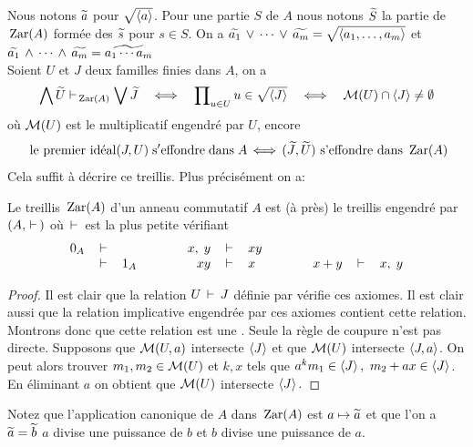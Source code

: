 Nous notons $\wi{a}$ pour $\sqrt{\gen{a}}$. Pour une partie $S$ de $A$
nous notons  $\wi{S}$ la partie de $\Zar(A)$ formée des  $\wi{s}$ pour
$s\in S$. On a $\wi{a_1}\vu\cdots\vu\wi{a_m}=\sqrt{\gen{a_1,\ldots,a_m}}$ 
et
$\wi{a_1}\vi\cdots\vi\wi{a_m}=\wi{a_1\cdots a_m}$ \\
Soient $U$ et  $J$  deux familles finies dans $A$, on a
$$\Vi\wi{U}\vdash_{\Zar(A)} \Vu\wi{J}
\quad\Longleftrightarrow \quad
\prod\nolimits_{u\in U} u  \in \sqrt{\gen{J}}
\quad\Longleftrightarrow \quad
\cM(U)\cap \gen{J}\neq \emptyset
$$
où $\cM(U)$ est le \mo multiplicatif engendré par $U$, \cad encore
$$ \hbox{ le \proi}(J,U){\rm \;s'effondre \;dans  \;  } A
\,\Longleftrightarrow \,
(\wi{J},\wi{U})\hbox{ s'effondre dans } \Zar(A)
$$
Cela suffit à décrire ce treillis. Plus précisément on a:
\begin{proposition}
\label{propZar} Le treillis $\Zar(A)$ d'un anneau commutatif $A$  est
(à \iso près) le treillis engendré par  $(A,\vda)$  où $\vda$
est la plus petite \entrel vérifiant
$$\begin{array}{rclcrclcrcl}
  0_A   & \vda  &      &\qquad  & x,\; y & \vda  &  x y   \\
        & \vda  &  1_A &\qquad &  xy    & \vda  &   x   &\qquad &
  x+y   & \vda  & x,\; y  \\
\end{array}$$
\end{proposition}
\begin{proof}
Il est clair que la relation $U\vda J$ définie par  vérifie ces axiomes. Il est clair aussi que la relation
implicative engendrée par ces axiomes contient cette relation.
Montrons donc que cette relation est une \entrel.
Seule la règle de coupure n'est pas directe.
Supposons que $\cM(U,a)$ intersecte
$\gen{J}$ et que $\cM(U)$ intersecte $\gen{J,a}$. On peut alors trouver
$m_1,m_2\in \cM(U)$ et $k,x$ tels que
$a^k m_1 \in \gen{J},~m_2+ax\in \gen{J}$.
En éliminant $a$ on obtient que $\cM(U)$ intersecte $\gen{J}.$
\end{proof}
Notez que l'application canonique de $A$ dans $\Zar(A)$ est
$a\mapsto \wi{a}$ et que l'on a $\wi{a}=\wi{b}$ \ssi $a$ divise une
puissance de $b$ et $b$ divise une puissance de $a$.

